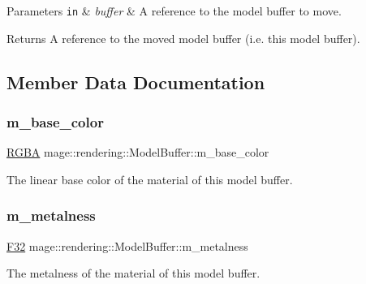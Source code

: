 \begin{DoxyParams}[1]{Parameters}
\mbox{\tt in}  & {\em buffer} & A reference to the model buffer to move. \\
\hline
\end{DoxyParams}
\begin{DoxyReturn}{Returns}
A reference to the moved model buffer (i.\+e. this model buffer). 
\end{DoxyReturn}


\subsection{Member Data Documentation}
\hypertarget{structmage_1_1rendering_1_1_model_buffer_a82c9d6dfd303c1a37c621e3fc4520232}{}\label{structmage_1_1rendering_1_1_model_buffer_a82c9d6dfd303c1a37c621e3fc4520232} 
\subsubsection{\texorpdfstring{m\+\_\+base\+\_\+color}{m\_base\_color}}
{\footnotesize\ttfamily \hyperlink{structmage_1_1_r_g_b_a}{R\+G\+BA} mage\+::rendering\+::\+Model\+Buffer\+::m\+\_\+base\+\_\+color}

The linear base color of the material of this model buffer. \hypertarget{structmage_1_1rendering_1_1_model_buffer_a4004bcf0d3fe8d0a5596d801d98c438a}{}\label{structmage_1_1rendering_1_1_model_buffer_a4004bcf0d3fe8d0a5596d801d98c438a} 
\subsubsection{\texorpdfstring{m\+\_\+metalness}{m\_metalness}}
{\footnotesize\ttfamily \hyperlink{namespacemage_aa97e833b45f06d60a0a9c4fc22ae02c0}{F32} mage\+::rendering\+::\+Model\+Buffer\+::m\+\_\+metalness}

The metalness of the material of this model buffer. \hypertarget{structmage_1_1rendering_1_1_model_buffer_a50a4684ae6f0139edc0108971249113a}{}\label{structmage_1_1rendering_1_1_model_buffer_a50a4684ae6f0139edc0108971249113a} 
